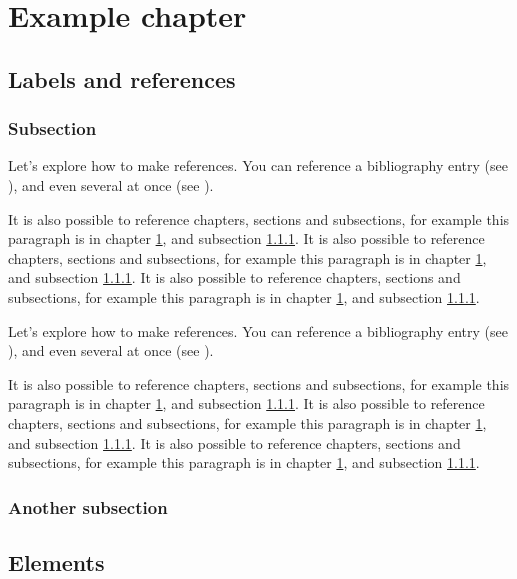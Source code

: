 \chapter{Example chapter}
\label{ch:example}

\section{Labels and references}

\subsection{Subsection}
\label{subsec:example}


Let's explore how to make references. You can reference a bibliography entry
(see \cite{einstein}), and even several at once (see \cite{dirac, knuthwebsite}).

It is also possible to reference chapters, sections and subsections, for example
this paragraph is in chapter \ref{ch:example}, and subsection \ref{subsec:example}.
It is also possible to reference chapters, sections and subsections, for example
this paragraph is in chapter \ref{ch:example}, and subsection \ref{subsec:example}.
It is also possible to reference chapters, sections and subsections, for example
this paragraph is in chapter \ref{ch:example}, and subsection \ref{subsec:example}.

Let's explore how to make references. You can reference a bibliography entry
(see \cite{einstein}), and even several at once (see \cite{dirac, knuthwebsite}).

It is also possible to reference chapters, sections and subsections, for example
this paragraph is in chapter \ref{ch:example}, and subsection \ref{subsec:example}.
It is also possible to reference chapters, sections and subsections, for example
this paragraph is in chapter \ref{ch:example}, and subsection \ref{subsec:example}.
It is also possible to reference chapters, sections and subsections, for example
this paragraph is in chapter \ref{ch:example}, and subsection \ref{subsec:example}.


\subsection{Another subsection}


\section{Elements}

